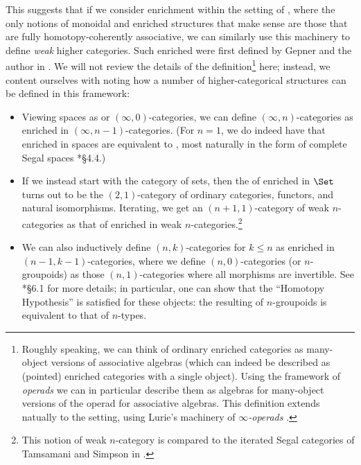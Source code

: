 \documentclass[a4paper,12pt]{article}
\begin{document}
This suggests that if we consider enrichment within the setting of
\icats{}, where the only notions of monoidal and enriched structures
that make sense are those that are fully homotopy-coherently
associative, we can similarly use this machinery to define \emph{weak}
higher categories. Such enriched \icats{} were first defined by Gepner
and the author in \cite{enr}. We will not review the details of
the definition\footnote{Roughly speaking, we can think of ordinary
  enriched categories as many-object versions of associative algebras
  (which can indeed be described as (pointed) enriched categories with
  a single object). Using the framework of \emph{operads} we can in
  particular describe them as algebras for many-object versions of the
  operad for associative algebras. This definition extends natually to
  the \icatl{} setting, using Lurie's machinery of
  \emph{$\infty$-operads} \cite{HA}.}
here; instead, we content ourselves with noting how a number of
higher-categorical structures can be defined in this framework:
\begin{itemize}
\item Viewing spaces as \igpds{} or $(\infty,0)$-categories, we can
  define $(\infty,n)$-categories as \icats{} enriched in
  $(\infty,n-1)$-categories. (For $n=1$, we do indeed have that
  \icats{} enriched in spaces are equivalent to \icats{}, most
  naturally in the form of complete Segal spaces \cite{enr}*{\S 4.4}.)
\item If we instead start with the category of sets, then the \icat{}
  of \icats{} enriched in $\Set$ turns out to be the $(2,1)$-category
  of ordinary categories, functors, and natural
  isomorphisms. Iterating, we get an $(n+1,1)$-category of weak
  $n$-categories as that of \icats{} enriched in weak
  $n$-categories.\footnote{This notion of weak $n$-category is
    compared to the iterated Segal categories of Tamsamani and Simpson
  in \cite{enrcomp}.}
\item We can also inductively define $(n,k)$-categories for $k \leq n$
  as \icats{} enriched in $(n-1,k-1)$-categories, where we define
  $(n,0)$-categories (or $n$-groupoids) as those $(n,1)$-categories
  where all morphisms are invertible. See \cite{enr}*{\S 6.1} for more
  details; in particular, one can show that the ``Homotopy
  Hypothesis'' is satisfied for these objects: the resulting \icat{} of
  $n$-groupoids is equivalent to that of $n$-types.
\end{itemize}
\end{document}
